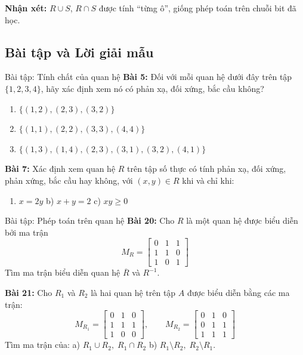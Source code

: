 \documentclass[12pt,a4paper]{article}
\begin{document}
\textbf{Nhận xét:} $R \cup S$, $R \cap S$ được tính ``từng ô'', giống phép toán trên chuỗi bit đã học.

\subsection{Bài tập và Lời giải mẫu}

\begin{baitap}{Bài tập: Tính chất của quan hệ}
\textbf{Bài 5:} Đối với mỗi quan hệ dưới đây trên tập $\{1, 2, 3, 4\}$, hãy xác định xem nó có phản xạ, đối xứng, bắc cầu không?
\begin{enumerate}[label=\alph*)]
  \item $\{(1, 2), (2, 3), (3, 2)\}$
  \item $\{(1, 1), (2, 2), (3, 3), (4, 4)\}$
  \item $\{(1, 3), (1, 4), (2, 3), (3, 1), (3, 2), (4, 1)\}$
\end{enumerate}

\textbf{Bài 7:} Xác định xem quan hệ $R$ trên tập số thực có tính phản xạ, đối xứng, phản xứng, bắc cầu hay không, với $(x, y) \in R$ khi và chỉ khi:
\begin{enumerate}[label=\alph*)]
  \item $x = 2y$ \qquad\qquad b) $x + y = 2$ \qquad\qquad c) $xy \ge 0$
\end{enumerate}
\end{baitap}

\begin{baitap}{Bài tập: Phép toán trên quan hệ}
\textbf{Bài 20:} Cho $R$ là một quan hệ được biểu diễn bởi ma trận
\[
  M_R = \begin{bmatrix} 0 & 1 & 1 \\ 1 & 1 & 0 \\ 1 & 0 & 1 \end{bmatrix}
\]
Tìm ma trận biểu diễn quan hệ $\overline{R}$ và $R^{-1}$.

\textbf{Bài 21:} Cho $R_1$ và $R_2$ là hai quan hệ trên tập $A$ được biểu diễn bằng các ma trận:
\[
  M_{R_1} = \begin{bmatrix} 0 & 1 & 0 \\ 1 & 1 & 1 \\ 1 & 0 & 0 \end{bmatrix}, \qquad
  M_{R_2} = \begin{bmatrix} 0 & 1 & 0 \\ 0 & 1 & 1 \\ 1 & 1 & 1 \end{bmatrix}
\]
Tìm ma trận của: \quad a) $R_1 \cup R_2,\; R_1 \cap R_2$ \qquad b) $R_1 \setminus R_2,\; R_2 \setminus R_1$.
\end{baitap}
\end{document}
